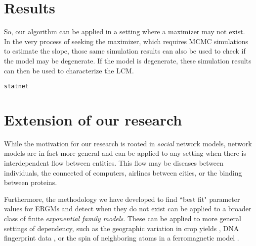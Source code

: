 \documentclass[12pt]{article}
\begin{document}
\section{Results}
So, our algorithm can be applied in a setting where a maximizer may not exist.  
In the very process of seeking the maximizer, which requires MCMC simulations 
to estimate the slope, those same simulation
results can also be used to check if the model may be degenerate.  If the 
model is degenerate, these simulation results can then be used to characterize the LCM.


\texttt{statnet} \citet{statnet:R}
\section{Extension of our research}
While the motivation for our research is rooted in \emph{social} network models, 
network models are in fact more general and can be applied to any setting when there is 
interdependent flow between entities.  This flow may be
diseases between individuals, the connected of computers, airlines between cities, 
or the binding between proteins.  

Furthermore, the methodology we have developed to find ``best fit" parameter 
values for ERGMs and detect when they do not exist can be applied to a 
broader class of finite \emph{exponential family models}.  These
can be applied to more general settings of dependency, such as the geographic 
variation in crop yields \citep{Besag:1974,Besag:1975},
DNA fingerprint data \citep{Geyer:1992}, or the spin of neighboring 
atoms in a ferromagnetic model \citep{Ising,Potts}.


\newpage




%

%


%

% 
\end{document}
